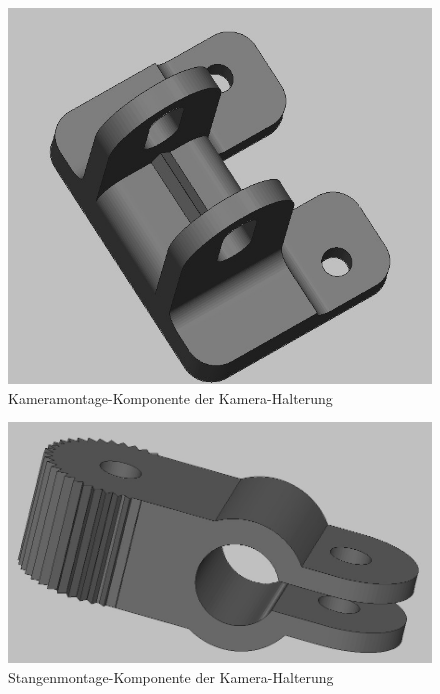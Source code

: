 \begin{minipage}[b]{0.44\textwidth}
\centering
\begin{figure}[H] %
\includegraphics[width=.8\textwidth]{sec2/images/3DAnbaukomponenten/Konstruktionsbilder/KameraHalterungKonstruktion02} 
\centering
\captionsetup{width=.9\textwidth}
\caption[Kameramontage-Komponente der Kamera-Halterung]{Kameramontage-Komponente der Kamera-Halterung}
\centering
\label{fig:KameraHalterungKonstruktion02}
\end{figure}
\end{minipage}
\begin{minipage}[b]{0.5\textwidth}
\begin{figure}[H] %
\includegraphics[width=.8\textwidth]{sec2/images/3DAnbaukomponenten/Konstruktionsbilder/KameraHalterungKonstruktion01} 
\centering
\captionsetup{width=.9\textwidth}
\caption[Stangenmontage-Komponente der Kamera-Halterung]{Stangenmontage-Komponente der Kamera-Halterung}
\centering
\label{fig:KameraHalterungKonstruktion01}
\end{figure}
\end{minipage}
\vspace{2mm}

